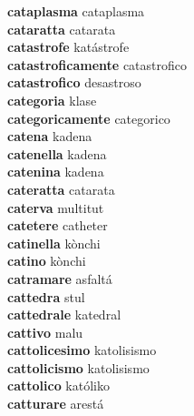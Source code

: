\textbf{cataplasma } cataplasma \\
\textbf{cataratta } catarata \\
\textbf{catastrofe } katástrofe \\
\textbf{catastroficamente } catastrofico \\
\textbf{catastrofico } desastroso \\
\textbf{categoria } klase \\
\textbf{categoricamente } categorico \\
\textbf{catena } kadena \\
\textbf{catenella } kadena \\
\textbf{catenina } kadena \\
\textbf{cateratta } catarata \\
\textbf{caterva } multitut \\
\textbf{catetere } catheter \\
\textbf{catinella } kònchi \\
\textbf{catino } kònchi \\
\textbf{catramare } asfaltá \\
\textbf{cattedra } stul \\
\textbf{cattedrale } katedral \\
\textbf{cattivo } malu \\
\textbf{cattolicesimo } katolisismo \\
\textbf{cattolicismo } katolisismo \\
\textbf{cattolico } katóliko \\
\textbf{catturare } arestá \\
